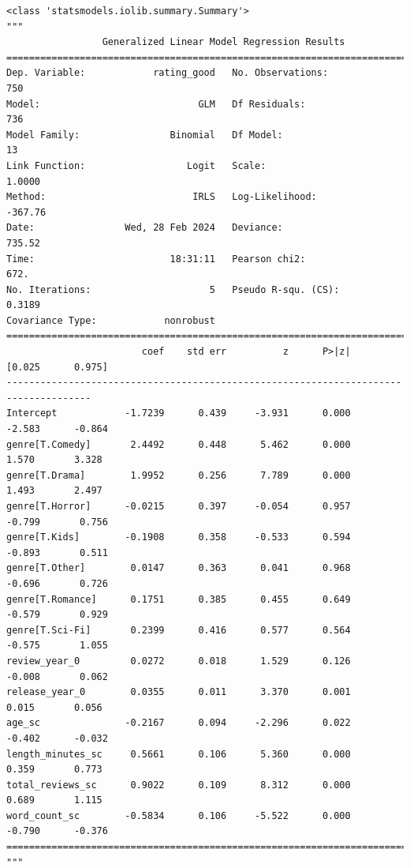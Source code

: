 \documentclass[
  letterpaper,
]{krantz}
\begin{document}
\begin{verbatim}
<class 'statsmodels.iolib.summary.Summary'>
"""
                 Generalized Linear Model Regression Results                  
==============================================================================
Dep. Variable:            rating_good   No. Observations:                  750
Model:                            GLM   Df Residuals:                      736
Model Family:                Binomial   Df Model:                           13
Link Function:                  Logit   Scale:                          1.0000
Method:                          IRLS   Log-Likelihood:                -367.76
Date:                Wed, 28 Feb 2024   Deviance:                       735.52
Time:                        18:31:11   Pearson chi2:                     672.
No. Iterations:                     5   Pseudo R-squ. (CS):             0.3189
Covariance Type:            nonrobust                                         
=====================================================================================
                        coef    std err          z      P>|z|      [0.025      0.975]
-------------------------------------------------------------------------------------
Intercept            -1.7239      0.439     -3.931      0.000      -2.583      -0.864
genre[T.Comedy]       2.4492      0.448      5.462      0.000       1.570       3.328
genre[T.Drama]        1.9952      0.256      7.789      0.000       1.493       2.497
genre[T.Horror]      -0.0215      0.397     -0.054      0.957      -0.799       0.756
genre[T.Kids]        -0.1908      0.358     -0.533      0.594      -0.893       0.511
genre[T.Other]        0.0147      0.363      0.041      0.968      -0.696       0.726
genre[T.Romance]      0.1751      0.385      0.455      0.649      -0.579       0.929
genre[T.Sci-Fi]       0.2399      0.416      0.577      0.564      -0.575       1.055
review_year_0         0.0272      0.018      1.529      0.126      -0.008       0.062
release_year_0        0.0355      0.011      3.370      0.001       0.015       0.056
age_sc               -0.2167      0.094     -2.296      0.022      -0.402      -0.032
length_minutes_sc     0.5661      0.106      5.360      0.000       0.359       0.773
total_reviews_sc      0.9022      0.109      8.312      0.000       0.689       1.115
word_count_sc        -0.5834      0.106     -5.522      0.000      -0.790      -0.376
=====================================================================================
"""
\end{verbatim}
\end{document}
